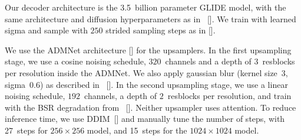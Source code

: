 \documentclass{article}
\newcommand{\shortcite}[1]{[\citenum{#1}]}
\newcommand{\namecite}[1]{\citeauthor{#1} [\citenum{#1}]}
\begin{document}
Our decoder architecture is the 3.5~billion parameter GLIDE model, with the same architecture and diffusion hyperparameters as in~\namecite{glide}. We train with learned sigma and sample with $250$ strided sampling steps as in \namecite{improved}. 

We use the ADMNet architecture \shortcite{sotapaper} for the upsamplers. In the first upsampling stage, we use a cosine noising schedule, $320$~channels and a depth of $3$~resblocks per resolution inside the ADMNet. We also apply gaussian blur (kernel size~$3$, sigma~$0.6$) as described in~\namecite{sr3}. In the second upsampling stage, we use a linear noising schedule, $192$~channels, a depth of $2$~resblocks per resolution, and train with the BSR degradation from~\namecite{latentdiffusion}. Neither upsampler uses attention. To reduce inference time, we use DDIM~\shortcite{ddim} and manually tune the number of steps, with 27~steps for $256 \times 256$ model, and 15~steps for the $1024 \times 1024$ model.
\end{document}
